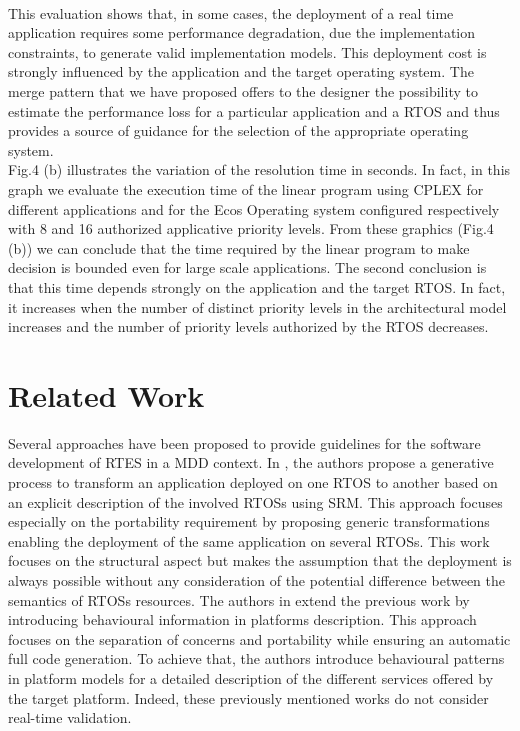 \documentclass[runningheads,a4paper]{llncs}
\begin{document}
\\This evaluation shows that, in some cases, the deployment of a real time application requires some performance degradation, due the implementation constraints, to generate valid implementation models. This deployment cost is strongly influenced by the application and the target operating system. The merge pattern that we have proposed offers to the designer the possibility to estimate the performance loss for a particular application and a RTOS and thus provides a source of guidance for the selection of the appropriate operating system. 
\\Fig.4 (b) illustrates the variation of the resolution time in seconds. In fact, in this graph we evaluate the execution time of the linear program using CPLEX for different applications and for the Ecos Operating system configured respectively with 8 and 16 authorized applicative priority levels. From these graphics (Fig.4 (b)) we can conclude that the time required by the linear program to make decision is bounded even for large scale applications. The second conclusion is that this time depends strongly on the application and the target RTOS. In fact, it increases when the number of distinct priority levels in the architectural model increases and the number of priority levels authorized by the RTOS decreases. 
\section{Related Work}
Several approaches have been proposed to provide guidelines for the software development of RTES in a MDD context. In \cite{thomas}, the authors propose a generative process to transform an application deployed on one RTOS to another based on an explicit description of the involved RTOSs using SRM. This approach focuses especially on the portability requirement by proposing generic transformations enabling the deployment of the same application on several RTOSs. This work focuses on the structural aspect but makes the assumption that the deployment is always possible without any consideration of the potential difference between the semantics of RTOSs resources. The authors in \cite{wassim} extend the previous work by introducing behavioural information in platforms description. This approach focuses on the separation of concerns and portability while ensuring an automatic full code generation. To achieve that, the authors introduce behavioural patterns in platform models for a detailed description of the different services offered by the target platform. Indeed, these previously mentioned works do not consider real-time validation. 
\end{document}
